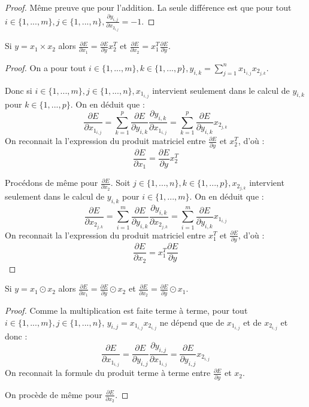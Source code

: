 \begin{proof}
Même preuve que pour l'addition. La seule différence est que pour tout $i \in \{1, ..., m\}, j \in \{1, ..., n\}, \frac{\partial y_{i, j}}{\partial x_{2_{i, j}}} = -1$.
\end{proof}

\begin{proposition}
Si $y = x_1 \times x_2$ alors $\frac{\partial E}{\partial x_1} = \frac{\partial E}{\partial y} x_2^T$ et $\frac{\partial E}{\partial x_2} = x_1^T \frac{\partial E}{\partial y}$.
\end{proposition}

\begin{proof}
On a pour tout $i \in \{1, ..., m\}, k \in \{1, ..., p\}, y_{i, k} = \sum_{j = 1}^{n}{x_{1_{i, j}}x_{2_{j, k}}}$.

Donc si $i \in \{1, ..., m\}, j \in \{1, ..., n\}, x_{1_{i, j}}$ intervient seulement dans le calcul de $y_{i, k}$ pour $k \in \{1, ..., p\}$. On en déduit que :
$$
\frac{\partial E}{\partial x_{1_{i, j}}} = \sum_{k = 1}^{p}{\frac{\partial E}{\partial y_{i, k}}\frac{\partial y_{i, k}}{\partial x_{1_{i, j}}}} = \sum_{k = 1}^{p}{\frac{\partial E}{\partial y_{i, k}}x_{2_{j, k}}} 
$$ 
On reconnait la l'expression du produit matriciel entre $\frac{\partial E}{\partial y}$ et $x_2^T$, d'où :
$$
\frac{\partial E}{\partial x_1} = \frac{\partial E}{\partial y} x_2^T
$$

Procédons de même pour $\frac{\partial E}{\partial x_2}$. Soit $j \in \{1, ..., n\}, k \in \{1, ..., p\}, x_{2_{j, k}}$ intervient seulement dans le calcul de $y_{i, k}$ pour $i \in \{1, ..., m\}$. On en déduit que :
$$
\frac{\partial E}{\partial x_{2_{j, k}}} = \sum_{i = 1}^{m}{\frac{\partial E}{\partial y_{i, k}}\frac{\partial y_{i, k}}{\partial x_{2_{j, k}}}} = \sum_{i = 1}^{m}{\frac{\partial E}{\partial y_{i, k}}x_{1_{i, j}}} 
$$ 
On reconnait la l'expression du produit matriciel entre $x_1^T$ et $\frac{\partial E}{\partial y}$, d'où :
$$
\frac{\partial E}{\partial x_2} = x_1^T \frac{\partial E}{\partial y}
$$
\end{proof}

\begin{proposition}
Si $y = x_1 \odot x_2$ alors $\frac{\partial E}{\partial x_1} = \frac{\partial E}{\partial y} \odot x_2$ et $\frac{\partial E}{\partial x_2} = \frac{\partial E}{\partial y} \odot x_1$.
\end{proposition}

\begin{proof}
Comme la multiplication est faite terme à terme, pour tout $i \in \{1, ..., m\}, j \in \{1, ..., n\}$, $y_{i, j} = x_{1_{i, j}}x_{2_{i, j}}$ ne dépend que de $x_{1_{i, j}}$ et de $x_{2_{i, j}}$ et donc :
$$
\frac{\partial E}{\partial x_{1_{i, j}}} = \frac{\partial E}{\partial y_{i, j}}\frac{\partial y_{i, j}}{\partial x_{1_{i, j}}} = \frac{\partial E}{\partial y_{i, j}}x_{2_{i, j}}
$$
On reconnait la formule du produit terme à terme entre $\frac{\partial E}{\partial y}$ et $x_2$.

On procède de même pour $\frac{\partial E}{\partial x_2}$.
\end{proof}

